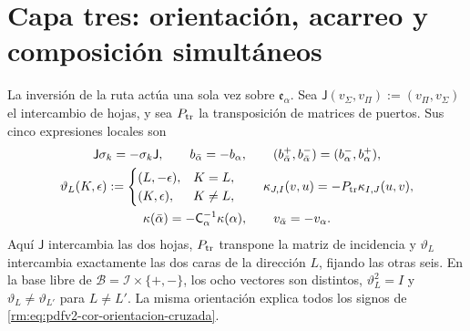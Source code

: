 \section{Capa tres: orientación, acarreo y composición simultáneos}

La inversión de la ruta actúa una sola vez sobre
\(\mathfrak e_\alpha\). Sea
\(\mathsf J(v_\Sigma,v_\Pi):=(v_\Pi,v_\Sigma)\) el intercambio de hojas,
y sea \(P_{\rm tr}\) la transposición de matrices de puertos. Sus cinco
expresiones locales son
\begin{equation}
\label{rm:eq:pdfv2-cor-orientacion-cruzada}
 \begin{gathered}
 \mathsf J\sigma_k=-\sigma_k\mathsf J,
 \qquad b_{\bar\alpha}=-b_\alpha,
 \qquad (b_{\bar\alpha}^+,b_{\bar\alpha}^-)
       =(b_\alpha^-,b_\alpha^+),\\
 \vartheta_L(K,\epsilon):=
 \begin{cases}
  (L,-\epsilon),&K=L,\\
  (K,\epsilon),&K\neq L,
 \end{cases}
 \qquad
 \kappa_{J,I}(v,u)=-P_{\rm tr}\kappa_{I,J}(u,v),\\
 \kappa(\bar\alpha)
 =-\mathsf C_\alpha^{-1}\kappa(\alpha),
 \qquad v_{\bar\alpha}=-v_\alpha.
 \end{gathered}
\end{equation}
Aquí \(\mathsf J\) intercambia las dos hojas, \(P_{\rm tr}\) transpone la matriz de
incidencia y \(\vartheta_L\) intercambia exactamente las dos caras de la
dirección \(L\), fijando las otras seis. En la base libre de
\(\mathscr B=\mathscr I\times\{+,-\}\), los ocho vectores son distintos,
\(\vartheta_L^2=I\) y
\(\vartheta_L\neq\vartheta_{L'}\) para \(L\neq L'\). La misma orientación
explica todos los signos de
\eqref{rm:eq:pdfv2-cor-orientacion-cruzada}.

